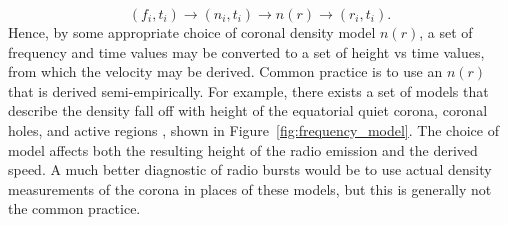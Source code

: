 \begin{equation}
(f_i, t_i) \rightarrow (n_i,t_i) \rightarrow n(r) \rightarrow (r_i,t_i).
\end{equation}
Hence, by some appropriate choice of coronal density model $n(r)$, a set of frequency and time values may be converted to a set of height vs time values, from which the velocity may be derived.
Common practice is to use an $n(r)$ that is derived semi-empirically. For example, there exists a set of models that describe the density fall off with height of the equatorial quiet corona, coronal holes, and active regions \citet{allen1947, newkirk1961, saito1977}, shown in Figure~\ref{fig:frequency_model}. The choice of model affects both the resulting height of the radio emission and the derived speed. A much better diagnostic of radio bursts would be to use actual density measurements of the corona in places of these models, but this is generally not the common practice.














